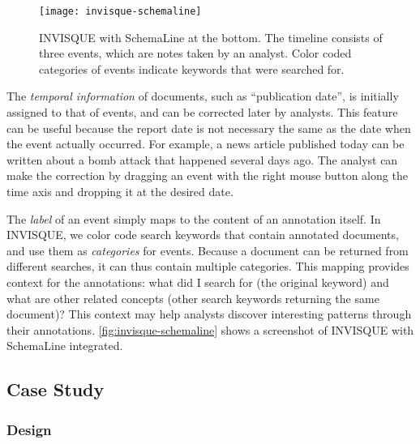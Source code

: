 \begin{figure}
	\centering
	\texttt{[image: invisque-schemaline]}
	\caption[INVISQUE with SchemaLine at the bottom]{INVISQUE with SchemaLine at the bottom. The timeline consists of three events, which are notes taken by an analyst. Color coded categories of events indicate keywords that were searched for.}
	\label{fig:invisque-schemaline}
\end{figure}

The \emph{temporal information} of documents, such as ``publication date'', is initially assigned to that of events, and can be corrected later by analysts. This feature can be useful because the report date is not necessary the same as the date when the event actually occurred. For example, a news article published today can be written about a bomb attack that happened several days ago. The analyst can make the correction by dragging an event with the right mouse button along the time axis and dropping it at the desired date.

The \emph{label} of an event simply maps to the content of an annotation itself. In INVISQUE, we color code search keywords that contain annotated documents, and use them as \emph{categories} for events. Because a document can be returned from different searches, it can thus contain multiple categories. This mapping provides context for the annotations: what did I search for (the original keyword) and what are other related concepts (other search keywords returning the same document)? This context may help analysts discover interesting patterns through their annotations. \autoref{fig:invisque-schemaline} shows a screenshot of INVISQUE with SchemaLine integrated.

\subsection{Case Study}

\subsubsection{Design}

